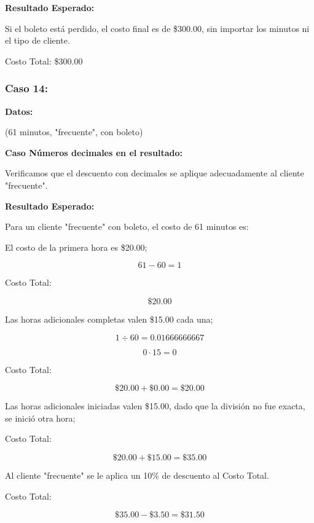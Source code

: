 \documentclass[11pt,letterpaper]{article}
\begin{document}
\textbf{Resultado Esperado:}

Si el boleto está perdido, el costo final es de \$300.00, sin importar los minutos ni el tipo de cliente.

Costo Total: \$300.00


\subsubsection{Caso 14:}
\label{sec:orgb8ed60a}

\textbf{Datos:}

(61 minutos, "frecuente", con boleto)

\textbf{Caso Números decimales en el resultado:}

Verificamos que el descuento con decimales se aplique adecuadamente al cliente "frecuente".

\vspace{\baselineskip}

\textbf{Resultado Esperado:}

Para un cliente "frecuente" con boleto, el costo de 61 minutos es:

El costo de la primera hora es \$20.00;

\[
   61 - 60 = 1
\]



Costo Total:

\[
   \text{\$}20.00
\]

Las horas adicionales completas valen \$15.00 cada una;

\[
   1 \div 60 = 0.01666666667
\]

\[
   0 \cdot 15 = 0
\]



Costo Total:

\[
   \text{\$}20.00 + \text{\$}0.00 = \text{\$}20.00
\]

Las horas adicionales iniciadas valen \$15.00, dado que la división no fue exacta, se inició otra hora;



Costo Total:

\[
   \text{\$}20.00 + \text{\$}15.00 = \text{\$}35.00
\]

Al cliente "frecuente" se le aplica un 10\% de descuento al Costo Total.



Costo Total:

\[
   \text{\$}35.00 - \text{\$}3.50 = \text{\$}31.50
\]
\end{document}
